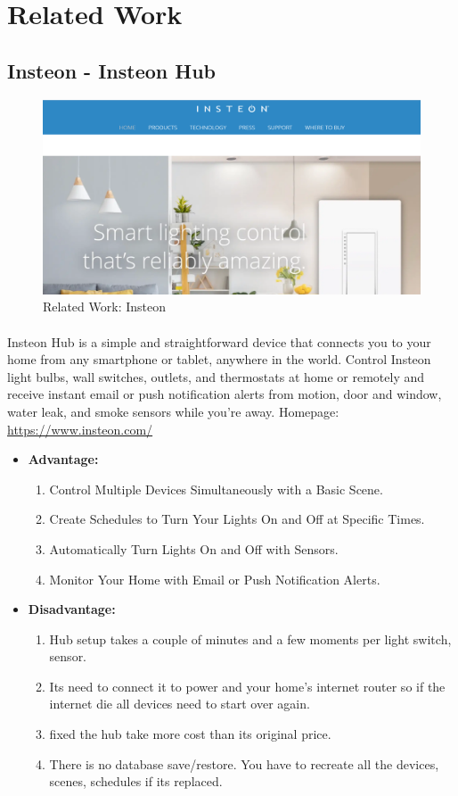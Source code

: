 \documentclass[a4paper, 12pt, oneside]{book}
\newcommand\boldcolor[1]{\textcolor{bold}{\textbf{#1}}}
\begin{document}
			
		\newpage	
		\section{Related Work}
		\subsection{Insteon - Insteon Hub}
		\begin{figure}[H]
  			\caption{Related Work: Insteon}
			\includegraphics[width=\linewidth]{img/insteon.png}
		\end{figure}
		\paragraph{}Insteon Hub is a simple and straightforward device that connects you to your home from any smartphone or tablet, anywhere in the world. Control Insteon light bulbs, wall switches, outlets, and thermostats at home or remotely and receive instant email or push notification alerts from motion, door and window, water leak, and smoke sensors while you’re away. Homepage: \url{https://www.insteon.com/}
		\begin{itemize}
		\item \boldcolor{Advantage:}
			\begin{enumerate}
				\item Control Multiple Devices Simultaneously with a Basic Scene.
				\item Create Schedules to Turn Your Lights On and Off at Specific Times.
				\item Automatically Turn Lights On and Off with Sensors.
				\item Monitor Your Home with Email or Push Notification Alerts.
			\end{enumerate}
		\item \boldcolor{Disadvantage:} 
			\begin{enumerate}
				\item Hub setup takes a couple of minutes and a few moments per light switch, sensor.
				\item Its need to connect it to power and your home's internet router so if the internet die all devices need to start over again. 
				\item fixed the hub take more cost than its original price.
				\item There is no database save/restore. You have to recreate all the devices, scenes, schedules if its replaced.
			\end{enumerate}
		\end{itemize}
		\newpage	
\end{document}

